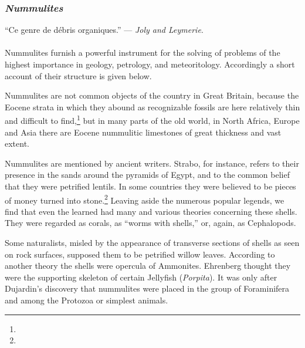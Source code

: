 \documentclass[a4paper, 12pt, oneside]{article}
\begin{document}
\subsubsection{\emph{Nummulites}}
\begin{displayquote}
``Ce genre de débris organiques.'' --- \emph{Joly and Leymerie}.
\end{displayquote}
\paragraph{}
Nummulites furnish a powerful instrument for the solving of problems of the highest importance in geology, petrology, and meteoritology. Accordingly a short account of their structure is given below.

Nummulites are not common objects of the country in Great Britain, because the Eocene strata in which they abound as recognizable fossils are here relatively thin and difficult to find,\footnote{} but in many parts of the old world, in North Africa, Europe and Asia there are Eocene nummulitic limestones of great thickness and vast extent.

Nummulites are mentioned by ancient writers. Strabo, for instance, refers to their presence in the sands around the pyramids of Egypt, and to the common belief that they were petrified lentils. In some countries they were believed to be pieces of money turned into stone.\footnote{} Leaving aside the numerous popular legends, we find that even the learned had many and various theories concerning these shells. They were regarded as corals, as ``worms with shells,'' or, again, as Cephalopods.

Some naturalists, misled by the appearance of transverse sections of shells as seen on rock surfaces, supposed them to be petrified willow leaves. According to another theory the shells were opercula of Ammonites. Ehrenberg thought they were the supporting skeleton of certain Jellyfish (\emph{Porpita}). It was only after Dujardin's discovery that nummulites were placed in the group of Foraminifera and among the Protozoa or simplest animals.
\end{document}
